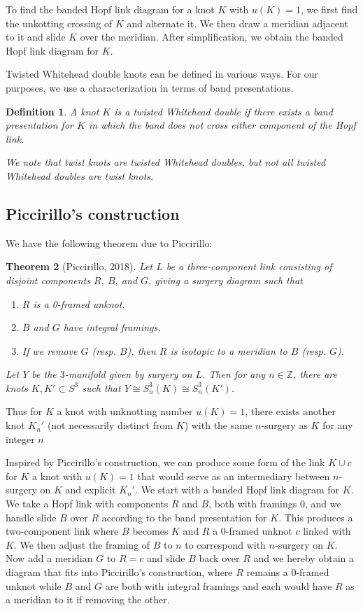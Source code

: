 \documentclass[11pt,usenames,dvipsnames,reqno]{amsart}
\newtheorem{theorem}{Theorem}
\numberwithin{theorem}{section}
\theoremstyle{ex}
\newtheorem{definition}[theorem]{Definition}
\theoremstyle{rem}
\begin{document}
To find the banded Hopf link diagram for a knot $K$ with $u(K) =1$, we first find the unkotting crossing of $K$ and alternate it. We then draw a meridian adjacent to it and slide $K$ over the meridian. After simplification, we obtain the banded Hopf link diagram for $K$. 

Twisted Whitehead double knots can be defined in various ways. For our purposes, we use a characterization in terms of band presentations.

\begin{definition} A knot $K$ is a \textit{twisted Whitehead double} if there exists a band presentation for $K$ in which the band does not cross either component of the Hopf link.
	
We note that twist knots are twisted Whitehead doubles, but not all twisted Whitehead doubles are twist knots.

\end{definition}

\subsection{Piccirillo's construction} We have the following theorem due to Piccirillo:

\begin{theorem}[Piccirillo, 2018]
	Let $L$ be a three-component link consisting of disjoint components $R$, $B$, and $G$, giving a surgery diagram such that
	\begin{enumerate}[label=\normalfont (\alph*)]
		\item $R$ is a 0-framed unknot,
		\item $B$ and $G$ have integral framings,
		\item If we remove $G$ (resp. $B$), then $R$ is isotopic to a meridian to $B$ (resp. $G$).
	\end{enumerate}
	Let $Y$ be the $3$-manifold given by surgery on $L$. Then for any $n\in\mathbb{Z}$, there are knots $K,K'\subset S^3$ such that $Y\cong S_n^3(K)\cong S_n^3(K')$.

\end{theorem}

Thus for $K$ a knot with unknotting number $u(K)=1$, there exists another knot $K_n'$ (not necessarily distinct from $K$) with the same $n$-surgery as $K$ for any integer $n$

Inspired by Piccirillo's construction, we can produce some form of the link $K \cup c$ for $K$ a knot with $u(K)=1$ that would serve as an intermediary between $n$-surgery on $K$ and explicit $K_n'$. We start with a banded Hopf link diagram for $K$. We take a Hopf link with components $R$ and $B$, both with framings 0, and we handle slide $B$ over $R$ according to the band presentation for $K$. This produces a two-component link where $B$ becomes $K$ and $R$ a 0-framed unknot $c$ linked with $K$. We then adjust the framing of $B$ to $n$ to correspond with $n$-surgery on $K$. Now add a meridian $G$ to $R=c$ and slide $B$ back over $R$ and we hereby obtain a diagram that fits into Piccirillo's construction, where $R$ remains a 0-framed unknot while $B$ and $G$ are both with integral framings and each would have $R$ as a meridian to it if removing the other. 
\end{document}
